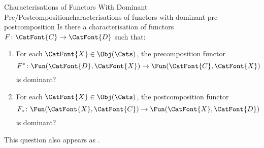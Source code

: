 \begin{question}{Characterisations of Functors With Dominant Pre/Postcomposition}{characterisations-of-functors-with-dominant-pre-postcomposition}%
    Is there a characterisation of functors $F\colon\CatFont{C}\to\CatFont{D}$ such that:
    \begin{enumerate}
        \item\label{characterisations-of-functors-with-dominant-pre-postcomposition-a}For each $\CatFont{X}\in\Obj(\Cats)$, the precomposition functor
            \[
                F^{*}%
                \colon%
                \Fun(\CatFont{D},\CatFont{X})%
                \to%
                \Fun(\CatFont{C},\CatFont{X})%
            \]%
            is dominant?
        \item\label{characterisations-of-functors-with-dominant-pre-postcomposition-b}For each $\CatFont{X}\in\Obj(\Cats)$, the postcomposition functor
            \[
                F_{*}%
                \colon%
                \Fun(\CatFont{X},\CatFont{C})%
                \to%
                \Fun(\CatFont{X},\CatFont{D})%
            \]%
            is dominant?
    \end{enumerate}
    This question also appears as \cite{MO468125}.
\end{question}

